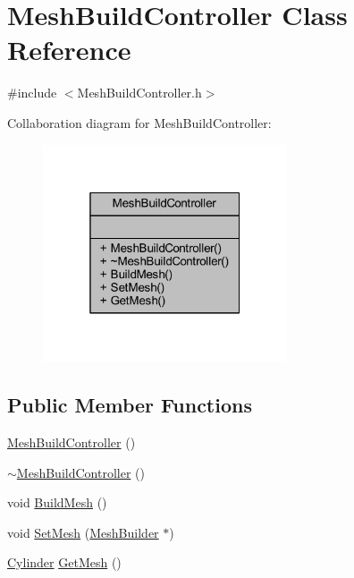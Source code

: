 \hypertarget{class_mesh_build_controller}{}\section{Mesh\+Build\+Controller Class Reference}
\label{class_mesh_build_controller}


{\ttfamily \#include $<$Mesh\+Build\+Controller.\+h$>$}



Collaboration diagram for Mesh\+Build\+Controller\+:
\nopagebreak
\begin{figure}[H]
\begin{center}
\leavevmode
\includegraphics[width=205pt]{class_mesh_build_controller__coll__graph}
\end{center}
\end{figure}
\subsection*{Public Member Functions}
\begin{DoxyCompactItemize}
\item 
\mbox{\hyperlink{class_mesh_build_controller_ac8ef0ce983b5809c737db46f6dc68b78}{Mesh\+Build\+Controller}} ()
\item 
\mbox{\hyperlink{class_mesh_build_controller_ac560bebe076bc5b1faee1b130f94c502}{$\sim$\+Mesh\+Build\+Controller}} ()
\item 
void \mbox{\hyperlink{class_mesh_build_controller_a5e9b10ae8668baf9abe53d8ba8233f67}{Build\+Mesh}} ()
\item 
void \mbox{\hyperlink{class_mesh_build_controller_aa08c7701786d5123c3fff36dcc1887b7}{Set\+Mesh}} (\mbox{\hyperlink{class_mesh_builder}{Mesh\+Builder}} $\ast$)
\item 
\mbox{\hyperlink{class_cylinder}{Cylinder}} \mbox{\hyperlink{class_mesh_build_controller_af2cef7d3c8a83ca7c206487fc5eb682e}{Get\+Mesh}} ()
\end{DoxyCompactItemize}


